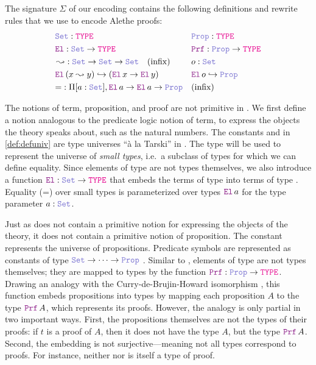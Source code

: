 \begin{definition}
\label{def:defuniv}
The signature $\Sigma$ of our encoding contains the following definitions and rewrite rules that we use to encode Alethe proofs:
\begin{align*}
&\set\index{\set}: \type & &\prop\index{\prop}: \type \\
&\index{\el{}} \el{}: \set \rightarrow \type  & &\index{\prf}\prf{} : \prop \rightarrow \type \\
&\mathop{\leadsto}\index{$\leadsto$}: \set \rightarrow \set \rightarrow \set \quad \text{(infix)} & &o: \set \\
&\el\,(x \leadsto y) \hookrightarrow (\el\,x \rightarrow \el\,y) & &\el\,o\index{o}  \hookrightarrow \prop \\
& {=} : \Pi [a : \set], \el\, a \ra \el\, a \ra \prop & & \text{(inﬁx)}
\end{align*}
\end{definition}

The notions of term, proposition, and proof are not primitive in \lpm.
We ﬁrst deﬁne a notion analogous to the predicate logic notion of term, to express the objects the theory speaks about, such as the natural numbers.
The constants \set{} and \prop{} in \cref{def:defuniv} are type universes ``à la Tarski'' \cite[\S Universes]{intuitype} in \lpm.
The type \set{} will be used to represent the universe of \textit{small types}, i.e.\ a subclass of types for which we can define equality.
Since elements of type \set{} are not types themselves,
we also introduce a function $\el: \set \rightarrow \type$ that embeds the terms of type \set{} into terms of type \type.
Equality (=) over small types is parameterized over types $\el\,a$ for the type parameter $a : \set{}$.

Just as \lpm{} does not contain a primitive notion for expressing the objects of the theory, it does not contain a primitive notion of proposition.
The constant \prop{} represents the universe of propositions. Predicate symbols are represented as constants of type $\set{} \ra \dots \ra \prop$ .
Similar to \set{}, elements of type \prop{} are not types themselves; they are mapped to types by the function $\prf{}: \prop \rightarrow \type$.
Drawing an analogy with the Curry-de-Brujin-Howard isomorphism \cite{curryhoward}, this function embeds propositions into types by mapping each proposition $A$ to the type $\prf\,A$, which represents its proofs.
However, the analogy is only partial in two important ways. First, the propositions themselves are not the types of their proofs: if $t$ is a proof of $A$, then it does not have the type $A$,
but the type $\prf\,A$. Second, the embedding is not surjective—meaning not all types correspond to proofs. For instance, neither \set{} nor \prop{} is itself a type of proof.

